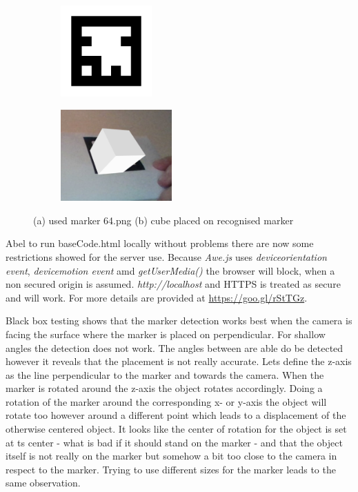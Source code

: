 \begin{figure}
	\begin{subfigure}[t]{0.45\textwidth}
		\centering
		\includegraphics[height = 3.5cm]{Document/Figures/chapter3/64}
		\caption{}
        \label{fig:marker}
	\end{subfigure}
	\hfill
	\begin{subfigure}[t]{0.45\textwidth}
		\centering
		\includegraphics[height = 3.5cm]{Document/Figures/chapter3/ScreenshotMarkerDetectedWhiteCube.jpg}
		\caption{}
        \label{fig:cube on marker}
	\end{subfigure}
	\caption[Marker and Cube]
			{(a) used marker 64.png
			 (b) cube placed on recognised marker}
\end{figure}

Abel to run {baseCode.html} locally without problems there are now some restrictions showed for the server use. Because \textit{Awe.js} uses \textit{deviceorientation event}, \textit{devicemotion event} amd \textit{getUserMedia()} the browser will block, when a non secured origin is assumed. \textit{http://localhost} and HTTPS is treated as secure and will work. For more details are provided at \url{https://goo.gl/rStTGz}.

Black box testing shows that the marker detection works best when the camera is facing the surface where the marker is placed on perpendicular. For shallow angles the detection does not work. The angles between are able do be detected however it reveals that the placement is not really accurate. 
Lets define the z-axis as the line perpendicular to the marker and towards the camera. When the marker is rotated around the z-axis the object rotates accordingly. Doing a rotation of the marker around the corresponding x- or y-axis the object will rotate too however around a different point which leads to a displacement of the otherwise centered object. It looks like the center of rotation for the object is set at ts center - what is bad if it should stand on the marker - and that the object itself is not really on the marker but somehow a bit too close to the camera in respect to the marker. Trying to use different sizes for  the marker leads to the same observation.

